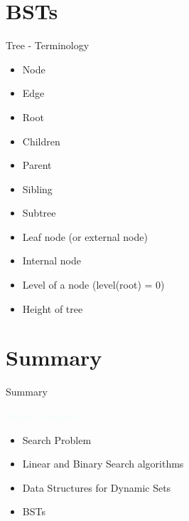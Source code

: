 \documentclass{beamer}
\newcommand{\tblue}[1]{{\Large {\textcolor{azure}{#1}}}}
\begin{document}
\section{BSTs}

\begin{frame}{Tree - Terminology}
\begin{itemize}
\item Node
\item Edge
\item Root
\item Children 
\item Parent 
\item Sibling
\item Subtree
\item Leaf node (or external node)
\item Internal node
\item Level of a node (level(root) = 0)
\item Height of tree
\end{itemize}
\end{frame}


\section{Summary}
\begin{frame}{Summary}

\tblue{Major Concepts:}
\begin{itemize}
\item Search Problem
\item Linear and Binary Search algorithms
\item Data Structures for Dynamic Sets
\item BSTs
\end{itemize}
\end{frame}
\end{document}
